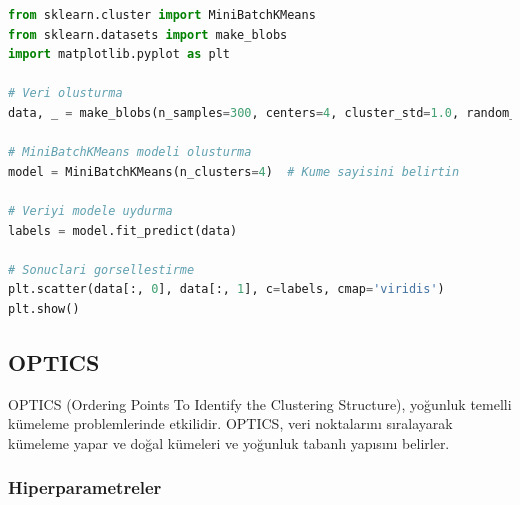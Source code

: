 \begin{lstlisting}[language=Python, caption=Scikit-learn'de MiniBatchKMeans.]
from sklearn.cluster import MiniBatchKMeans
from sklearn.datasets import make_blobs
import matplotlib.pyplot as plt

# Veri olusturma
data, _ = make_blobs(n_samples=300, centers=4, cluster_std=1.0, random_state=42)

# MiniBatchKMeans modeli olusturma
model = MiniBatchKMeans(n_clusters=4)  # Kume sayisini belirtin

# Veriyi modele uydurma
labels = model.fit_predict(data)

# Sonuclari gorsellestirme
plt.scatter(data[:, 0], data[:, 1], c=labels, cmap='viridis')
plt.show()
\end{lstlisting}

\newpage

\subsection{OPTICS}
OPTICS (Ordering Points To Identify the Clustering Structure), yoğunluk temelli kümeleme problemlerinde etkilidir. OPTICS, veri noktalarını sıralayarak kümeleme yapar ve doğal kümeleri ve yoğunluk tabanlı yapısını belirler.

\subsubsection{Hiperparametreler}

\begin{table}[h]
\centering
{\scriptsize\renewcommand{\arraystretch}{0.4}
{}}
\end{table}

